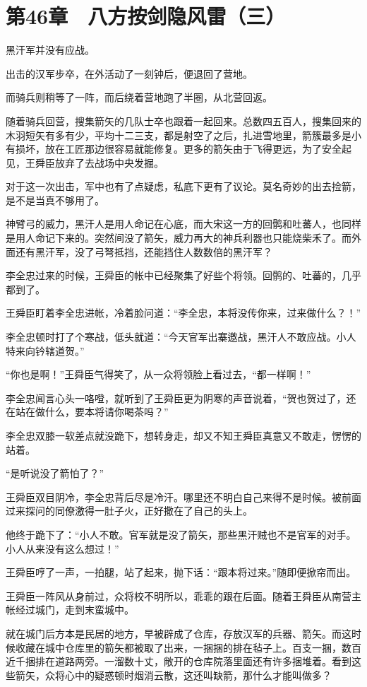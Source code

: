 \section{第46章　八方按剑隐风雷（三）}

黑汗军并没有应战。

出击的汉军步卒，在外活动了一刻钟后，便退回了营地。

而骑兵则稍等了一阵，而后绕着营地跑了半圈，从北营回返。

随着骑兵回营，搜集箭矢的几队士卒也跟着一起回来。总数四五百人，搜集回来的木羽短矢有多有少，平均十二三支，都是射空了之后，扎进雪地里，箭簇最多是小有损坏，放在工匠那边很容易就能修复。更多的箭矢由于飞得更远，为了安全起见，王舜臣放弃了去战场中央发掘。

对于这一次出击，军中也有了点疑虑，私底下更有了议论。莫名奇妙的出去捡箭，是不是当真不够用了。

神臂弓的威力，黑汗人是用人命记在心底，而大宋这一方的回鹘和吐蕃人，也同样是用人命记下来的。突然间没了箭矢，威力再大的神兵利器也只能烧柴禾了。而外面还有黑汗军，没了弓弩抵挡，还能挡住人数数倍的黑汗军？

李全忠过来的时候，王舜臣的帐中已经聚集了好些个将领。回鹘的、吐蕃的，几乎都到了。

王舜臣盯着李全忠进帐，冷着脸问道：“李全忠，本将没传你来，过来做什么？！”

李全忠顿时打了个寒战，低头就道：“今天官军出寨邀战，黑汗人不敢应战。小人特来向钤辖道贺。”

“你也是啊！”王舜臣气得笑了，从一众将领脸上看过去，“都一样啊！”

李全忠闻言心头一咯噔，就听到了王舜臣更为阴寒的声音说着，“贺也贺过了，还在站在做什么，要本将请你喝茶吗？”

李全忠双膝一软差点就没跪下，想转身走，却又不知王舜臣真意又不敢走，愣愣的站着。

“是听说没了箭怕了？”

王舜臣双目阴冷，李全忠背后尽是冷汗。哪里还不明白自己来得不是时候。被前面过来探问的同僚激得一肚子火，正好撒在了自己的头上。

他终于跪下了：“小人不敢。官军就是没了箭矢，那些黑汗贼也不是官军的对手。小人从来没有这么想过！”

王舜臣哼了一声，一拍腿，站了起来，抛下话：“跟本将过来。”随即便掀帘而出。

王舜臣一阵风从身前过，众将校不明所以，乖乖的跟在后面。随着王舜臣从南营主帐经过城门，走到末蛮城中。

就在城门后方本是民居的地方，早被辟成了仓库，存放汉军的兵器、箭矢。而这时候收藏在城中仓库里的箭矢都被取了出来，一捆捆的排在毡子上。百支一捆，数百近千捆排在道路两旁。一溜数十丈，敞开的仓库院落里面还有许多捆堆着。看到这些箭矢，众将心中的疑惑顿时烟消云散，这还叫缺箭，那什么才能叫做多？

